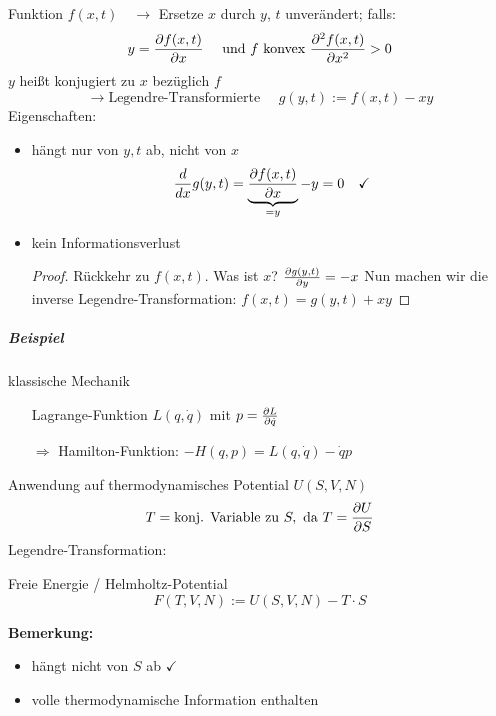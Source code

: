 Funktion $f(x,t) \quad \rightarrow$ Ersetze $x$ durch $y$, $t$ unverändert; falls:
\begin{equation}
    y = \pdv{f(x,t)}{x} \quad \text{ und $f$ konvex } \frac{\partial^2 f(x,t)}{\partial x^2} > 0
\end{equation}
$y$ heißt konjugiert zu $x$ bezüglich $f$
\begin{equation}
    \rightarrow \text{Legendre-Transformierte  } \quad g(y,t):= f(x,t) - xy
\end{equation}
Eigenschaften:
\begin{itemize}
    \item hängt nur von $y,t$ ab, nicht von $x$
    \begin{equation}
        \frac{d}{dx} g(y,t) = \underbrace{\pdv{f(x,t)}{x}}_{=y} -y = 0 \quad \checkmark
    \end{equation}
    \item kein Informationsverlust
    \begin{proof}
        Rückkehr zu $f(x,t)$. Was ist $x$? $\pdv{g(y,t)}{y} = -x$ Nun machen wir die inverse Legendre-Transformation: $f(x,t) = g(y,t) + xy$
    \end{proof}
\end{itemize}

\subparagraph{Beispiel} klassische Mechanik
\begin{itemize}
    \item[] Lagrange-Funktion $L(q,\Dot{q})$ mit $p = \pdv{L}{\Dot{q}}$
    \item[$\Rightarrow$] Hamilton-Funktion: $-H(q,p) = L(q,\Dot{q}) - \Dot{q}p$ 
\end{itemize}
Anwendung auf thermodynamisches Potential $U(S,V,N)$
\begin{equation}
    T = \text{konj. Variable zu } S, \text{ da } T = \pdv{U}{S}
\end{equation}
Legendre-Transformation:
\begin{definition}{Freie Energie / Helmholtz-Potential}
\begin{equation}
    F(T,V,N) := U(S,V,N) - T \cdot S
\end{equation}
\end{definition}
\textbf{Bemerkung:}
\begin{itemize}
    \item hängt nicht von $S$ ab $\checkmark$
    \item volle thermodynamische Information enthalten
\end{itemize}


